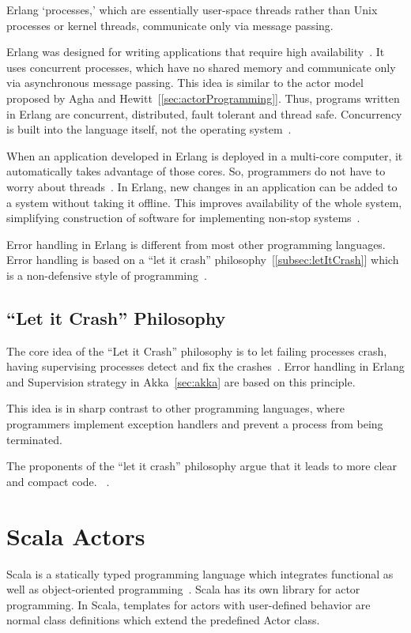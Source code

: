   Erlang ‘processes,’ which are essentially user-space threads rather than Unix processes or kernel threads, communicate only via message passing.~\cite{armstrong}

  Erlang was designed for writing applications that require high availability~\cite{armstrong}. It uses concurrent processes, which have no shared memory and communicate only via asynchronous message passing. This idea is similar to the actor model proposed by Agha and Hewitt~[\autoref{sec:actorProgramming}]. Thus, programs written in Erlang are concurrent, distributed, fault tolerant and thread safe. Concurrency is built into the language itself, not the operating system~\cite{Armstrong:2010:ERL:1810891.1810910}.

  When an application developed in Erlang is deployed in a multi-core computer, it automatically takes advantage of those cores. So, programmers do not have to worry about threads~\cite{Armstrong:2010:ERL:1810891.1810910}. In Erlang, new changes in an application can be added to a system without taking it offline. This improves availability of the whole system, simplifying construction of software for implementing non-stop systems~\cite{armstrong}.

  Error handling in Erlang is different from most other programming languages. Error handling is based on a “let it crash” philosophy~[\autoref{subsec:letItCrash}] which is a non-defensive style of programming~\cite{armstrong, Armstrong:2010:ERL:1810891.1810910}.

\subsection{“Let it Crash” Philosophy}
\label{subsec:letItCrash}
  The core idea of the “Let it Crash” philosophy is to let failing processes crash, having supervising processes detect and fix the crashes~\cite{Armstrong:2010:ERL:1810891.1810910}. Error handling in Erlang and Supervision strategy in Akka~\autoref{sec:akka} are based on this principle.

   This idea is in sharp contrast to other programming languages, where programmers implement exception handlers and prevent a process from being terminated.

  The proponents of the “let it crash” philosophy argue that it leads to more clear and compact code.
~\cite{Armstrong:2010:ERL:1810891.1810910}.

\section{Scala Actors}
\label{sec:scala}
Scala is a statically typed programming language which integrates functional as well as object-oriented programming~\cite{Odersky}. Scala has its own library for actor programming. In Scala, templates for actors with user-defined behavior are normal class definitions which extend the predefined Actor class.

